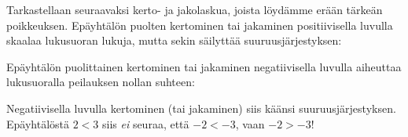 \begin{lukusuora}{-1}{10}{12}

\lukusuorauusi
\end{lukusuora}

Tarkastellaan seuraavaksi kerto- ja jakolaskua, joista löydämme erään tärkeän poikkeuksen. Epäyhtälön puolten kertominen tai jakaminen positiivisella luvulla skaalaa lukusuoran lukuja, mutta sekin säilyttää suuruusjärjestyksen:

\begin{lukusuora}{-1}{10}{12}

\lukusuorauusi
\end{lukusuora}

\begin{lukusuora}{-1}{10}{12}

\lukusuorauusi
\end{lukusuora}

Epäyhtälön puolittainen kertominen tai jakaminen negatiivisella luvulla aiheuttaa lukusuoralla peilauksen nollan suhteen:

\begin{lukusuora}{-6}{10}{6}

\lukusuorauusi
\end{lukusuora}

Negatiivisella luvulla kertominen (tai jakaminen) siis käänsi suuruusjärjestyksen.
Epäyhtälöstä $2<3$ siis \textit{ei} seuraa, että $-2<-3$, vaan $-2>-3$!

